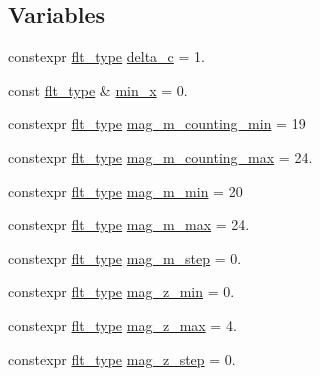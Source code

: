 \subsection*{Variables}
\begin{DoxyCompactItemize}
\item 
constexpr \hyperlink{lib_2IceBRG__main_2common_8h_ad0f130a56eeb944d9ef2692ee881ecc4}{flt\-\_\-type} \hyperlink{namespaceIceBRG_a7ec2b20e0b731b6392e5779857559ba2}{delta\-\_\-c} = 1.
\item 
const \hyperlink{lib_2IceBRG__main_2common_8h_ad0f130a56eeb944d9ef2692ee881ecc4}{flt\-\_\-type} \& \hyperlink{namespaceIceBRG_a2669894c97834b30c36e7a378a161fda}{min\-\_\-x} = 0.
\item 
constexpr \hyperlink{lib_2IceBRG__main_2common_8h_ad0f130a56eeb944d9ef2692ee881ecc4}{flt\-\_\-type} \hyperlink{namespaceIceBRG_a94be0eaeb0bfcdc8dae4a1aa020b5e60}{mag\-\_\-m\-\_\-counting\-\_\-min} = 19
\item 
constexpr \hyperlink{lib_2IceBRG__main_2common_8h_ad0f130a56eeb944d9ef2692ee881ecc4}{flt\-\_\-type} \hyperlink{namespaceIceBRG_ac6de07edf41f9e5c1c7e8c5f1689f17c}{mag\-\_\-m\-\_\-counting\-\_\-max} = 24.
\item 
constexpr \hyperlink{lib_2IceBRG__main_2common_8h_ad0f130a56eeb944d9ef2692ee881ecc4}{flt\-\_\-type} \hyperlink{namespaceIceBRG_af21cb728e53beb5bc6bf61e06d466535}{mag\-\_\-m\-\_\-min} = 20
\item 
constexpr \hyperlink{lib_2IceBRG__main_2common_8h_ad0f130a56eeb944d9ef2692ee881ecc4}{flt\-\_\-type} \hyperlink{namespaceIceBRG_afe312c946480f9d2fa951168035a3a09}{mag\-\_\-m\-\_\-max} = 24.
\item 
constexpr \hyperlink{lib_2IceBRG__main_2common_8h_ad0f130a56eeb944d9ef2692ee881ecc4}{flt\-\_\-type} \hyperlink{namespaceIceBRG_a0dc0ffd6663af1f01df1e07c25556a13}{mag\-\_\-m\-\_\-step} = 0.
\item 
constexpr \hyperlink{lib_2IceBRG__main_2common_8h_ad0f130a56eeb944d9ef2692ee881ecc4}{flt\-\_\-type} \hyperlink{namespaceIceBRG_ad984585cf2116d7dba1d297d6fa7d3f1}{mag\-\_\-z\-\_\-min} = 0.
\item 
constexpr \hyperlink{lib_2IceBRG__main_2common_8h_ad0f130a56eeb944d9ef2692ee881ecc4}{flt\-\_\-type} \hyperlink{namespaceIceBRG_ac405728ac8f0dd2dc9ef8e4e332c48a2}{mag\-\_\-z\-\_\-max} = 4.
\item 
constexpr \hyperlink{lib_2IceBRG__main_2common_8h_ad0f130a56eeb944d9ef2692ee881ecc4}{flt\-\_\-type} \hyperlink{namespaceIceBRG_a1394dcf9ab9fe4a99d8315787e81a2eb}{mag\-\_\-z\-\_\-step} = 0.

\end{DoxyCompactItemize}
